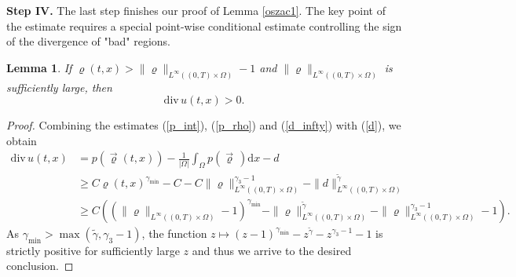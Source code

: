 \documentclass[11pt]{article}
\newcommand{\dd}{\mathrm{d}}
\newcommand{\ddiv}{\mathrm{div\,}}
\newtheorem{lem}[tw]{Lemma}
\numberwithin{equation}{section}
\numberwithin{tw}{section}
\begin{document}
\smallskip

{\bf Step IV.} The last step finishes our proof of Lemma \ref{oszac1}. The key point of the estimate requires a special point-wise conditional estimate controlling the sign of the divergence of "bad" regions.


\begin{lem}\label{divu_positive}
    If $\varrho(t,x)>\|\varrho\|_{L^\infty((0,T)\times\Omega)}-1$ and $\|\varrho\|_{L^\infty((0,T)\times\Omega)}$ is sufficiently large, then 
    \[ \ddiv u(t,x) >0. \]
\end{lem}
\begin{proof}
\noindent
Combining the estimates (\ref{p_int}), (\ref{p_rho}) and (\ref{d_infty}) with (\ref{d}), we obtain
\[\begin{aligned} \ddiv u(t,x) &= p(\vec\varrho(t,x))-\frac{1}{|\Omega|}\int_\Omega p(\vec\varrho\,)\dd x -d \\
&\geq C\varrho(t,x)^{\gamma_{\min}}-C - C\|\varrho\|_{L^\infty((0,T)\times\Omega)}^{\gamma_3-1}-\|d\|_{L^\infty((0,T)\times\Omega)}^{\tilde\gamma} \\
&\geq C\left(\left(\|\varrho\|_{L^\infty((0,T)\times\Omega)}-1\right)^{\gamma_{\min}} - \|\varrho\|_{L^\infty((0,T)\times\Omega)}^{\tilde\gamma}-\|\varrho\|_{L^\infty((0,T)\times\Omega)}^{\gamma_3-1}-1\right). 
\end{aligned}\]
As $\gamma_{\min}>\max(\tilde\gamma,\gamma_3-1)$, the function $ z\mapsto (z-1)^{\gamma_{\min}}-z^{\tilde\gamma}-z^{\gamma_3-1}-1$
is strictly positive for sufficiently large $z$ and thus we arrive to the desired conclusion.
\end{proof}


\end{document}
